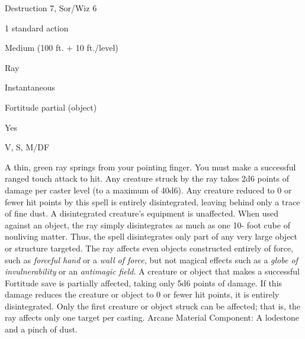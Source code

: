 
\begin{description*}
\item[Level:] Destruction 7, Sor/Wiz 6
\item[Casting Time:] 1 standard action
\item[Range:] Medium (100 ft. + 10 ft./level)
\item[Effect:] Ray
\item[Duration:] Instantaneous
\item[Saving Throw:] Fortitude partial (object)
\item[Spell Resistance:] Yes
\item[Components:] V, S, M/DF
\end{description*}

A thin, green ray springs from your pointing finger. You must make a successful
ranged touch attack to hit. Any creature struck by the ray takes 2d6 points of
damage per caster level (to a maximum of 40d6). Any creature reduced to 0 or fewer
hit points by this spell is entirely disintegrated, leaving behind only a trace
of fine dust. A disintegrated creature's equipment is unaffected.
When used against an object, the ray simply disintegrates as much as one 10- foot
cube of nonliving matter. Thus, the spell disintegrates only part of any very large
object or structure targeted. The ray affects even objects constructed entirely
of force, such as \textit{forceful hand} or a \textit{wall of force}, but not magical
effects such as a \textit{globe of invulnerability} or an \textit{antimagic field}.
A creature or object that makes a successful Fortitude save is partially affected,
taking only 5d6 points of damage. If this damage reduces the creature or object
to 0 or fewer hit points, it is entirely disintegrated.
Only the first creature or object struck can be affected; that is, the ray affects
only one target per casting.
Arcane Material Component: A lodestone and a pinch of dust.